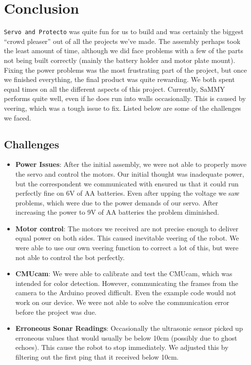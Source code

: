 \documentclass[11pt]{article}
\begin{document}
\section{Conclusion}
\texttt{Servo and Protecto} was quite fun for us to build and was certainly the biggest ``crowd pleaser'' out of all the projects we've made.  The assembly perhaps took the least amount of time, although we did face problems with a few of the parts not being built correctly (mainly the battery holder and motor plate mount).  Fixing the power problems was the most frustrating part of the project, but once we finished everything, the final product was quite rewarding.  We both spent equal times on all the different aspects of this project.  Currently, SaMMY performs quite well, even if he does run into walls occasionally.  This is caused by veering, which was a tough issue to fix. Listed below are some of the challenges we faced.
	
	\subsection{Challenges}
		
		\begin{itemize}				
		\item \textbf{Power Issues}: After the initial assembly, we were not able to properly move the servo and control the motors.  Our initial thought was inadequate power, but the correspondent we communicated with ensured us that it could run perfectly fine on 6V of AA batteries.  Even after upping the voltage we saw problems, which were due to the power demands of our servo.  After increasing the power to 9V of AA batteries the problem diminished.
		\item \textbf{Motor control}: The motors we received are not precise enough to deliver equal power on both sides.  This caused inevitable veering of the robot.  We were able to use our own veering function to correct a lot of this, but were not able to control the bot perfectly.
		\item \textbf{CMUcam}: We were able to calibrate and test the CMUcam, which was intended for color detection.  However, communicating the frames from the camera to the Arduino proved difficult.  Even the example code would not work on our device. We were not able to solve the communication error before the project was due.
		\item \textbf{Erroneous Sonar Readings}: Occasionally the ultrasonic sensor picked up erroneous values that would usually be below 10cm (possibly due to ghost echoes).  This cause the robot to stop immediately.  We adjusted this by filtering out the first ping that it received below 10cm.
		\end{itemize}
\end{document}
